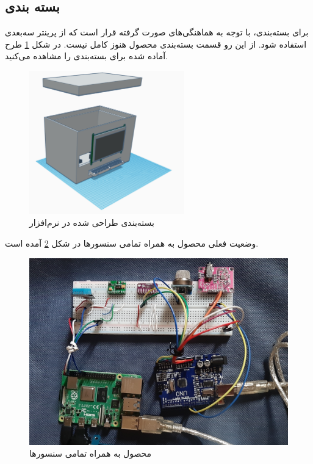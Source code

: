 \subsection{بسته بندی}

برای بسته‌بندی، با توجه به هماهنگی‌های صورت گرفته قرار است که از پرینتر سه‌بعدی استفاده شود. از این رو قسمت بسته‌بندی محصول هنوز کامل نیست. در شکل \ref{fig:9} طرح آماده شده برای بسته‌بندی را مشاهده می‌کنید.

\begin{figure}[h]
	\centering
	\includegraphics[width=0.6\textwidth]{figs/package.png}
	
	\caption{بسته‌بندی طراحی شده در نرم‌افزار }
	\label{fig:9}
\end{figure}

وضعیت فعلی محصول به همراه تمامی سنسور‌ها در شکل \ref{fig:10} آمده است.


\begin{figure}[h]
	\centering
	\includegraphics[width=1.0\textwidth]{figs/all.jpg}
	
	\caption{محصول به همراه تمامی سنسور‌ها }
	\label{fig:10}
\end{figure}

